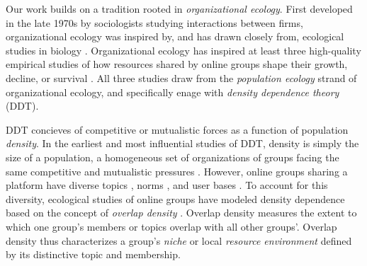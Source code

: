 \documentclass[letterpaper]{article}\usepackage[]{graphicx}\usepackage[]{color}
\begin{document}
Our work builds on a tradition rooted in \textit{organizational ecology}. First developed in the late 1970s by sociologists studying interactions between firms, organizational ecology was inspired by, and has drawn closely from, ecological studies in biology \citep{hannan_organizational_1989}. 
Organizational ecology has inspired at least three high-quality empirical studies of how resources shared by online groups shape their growth, decline, or survival \cite{wang_impact_2012, zhu_impact_2014, zhu_selecting_2014}.
All three studies draw from the \textit{population ecology} strand of organizational ecology, and specifically enage with \textit{density dependence theory} (DDT).






DDT concieves of competitive or mutualistic forces as a function of population \textit{density}. In the earliest and most influential studies of DDT, density is simply the size of a population, a homogeneous set of organizations of groups facing the same competitive and mutualistic pressures \cite{aldrich_organizations_2006}.
However, online groups sharing a platform have diverse topics \cite{kairam_life_2012}, norms \cite{chandrasekharan_internets_2018}, and user bases \cite{tan_tracing_2018, tan_all_2015}. 
To account for this diversity, ecological studies of online groups have modeled density dependence based on the concept of \emph{overlap density} \cite{baum_ecological_2006,  wang_impact_2012, zhu_impact_2014, zhu_selecting_2014}. 
Overlap density measures the extent to which one group's members or topics overlap with all other groups'. Overlap density thus characterizes a group's \emph{niche} or local \emph{resource environment} defined by its distinctive topic and membership.
\end{document}
